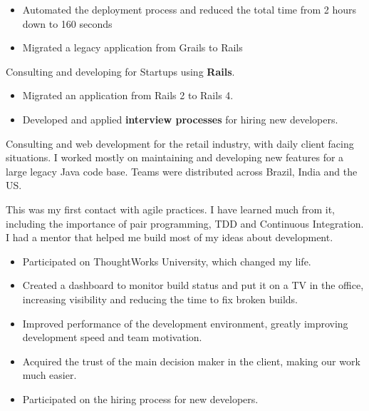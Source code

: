 \documentclass[10pt,a4paper,ragged2e,withhyper]{altacv}
\newcommand{\accentbold}[1]{\textbf{\textcolor{accent}{#1}}}
\begin{document}
\begin{paracol}{2}
{\medskip

\begin{itemize}
\item Automated the deployment process and reduced the total time from 2 hours down to 160 seconds
\item Migrated a legacy application from Grails to Rails
\end{itemize}
}

\divider


{\RaggedRight
Consulting and developing for Startups using \accentbold{Rails}.

\medskip

\begin{itemize}
\item Migrated an application from Rails 2 to Rails 4.
\item Developed and applied \accentbold{interview processes} for hiring new developers.
\end{itemize}
}

\divider


{\RaggedRight
Consulting and web development for the retail industry, with daily client facing situations. I worked mostly on maintaining and developing new features for a large legacy Java code base. Teams were distributed across Brazil, India and the US.

\medskip

This was my first contact with agile practices. I have learned much from it, including the importance of pair programming, TDD and Continuous Integration. I had a mentor that helped me build most of my ideas about development.

\medskip

\begin{itemize}
\item Participated on ThoughtWorks University, which changed my life.
\item Created a dashboard to monitor build status and put it on a TV in the office, increasing visibility and reducing the time to fix broken builds.
\item Improved performance of the development environment, greatly improving development speed and team motivation.
\item Acquired the trust of the main decision maker in the client, making our work much easier.
\item Participated on the hiring process for new developers.
\end{itemize}
}


\end{paracol}
\end{document}
